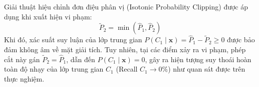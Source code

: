 Giải thuật hiệu chỉnh đơn điệu phân vị (Isotonic Probability Clipping) được áp dụng khi xuất hiện vi phạm:
\begin{equation}
    \tilde{P}_2 = \min\left(\hat{P}_1, \hat{P}_2\right)
\end{equation}
Khi đó, xác suất suy luận của lớp trung gian $P(C_1 \mid \mathbf{x}) = \hat{P}_1 - \tilde{P}_2 \ge 0$ được bảo đảm không âm về mặt giải tích. Tuy nhiên, tại các điểm xảy ra vi phạm, phép cắt này gán $\tilde{P}_2 = \hat{P}_1$, dẫn đến $P(C_1 \mid \mathbf{x}) = 0$, gây ra hiện tượng suy thoái hoàn toàn độ nhạy của lớp trung gian $C_1$ (Recall $C_1 \to 0\%$) như quan sát được trên thực nghiệm.
